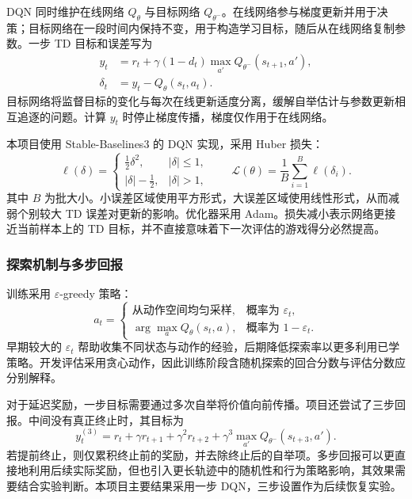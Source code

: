 DQN 同时维护在线网络 $Q_\theta$ 与目标网络 $Q_{\theta^-}$。在线网络参与梯度更新并用于决策；目标网络在一段时间内保持不变，用于构造学习目标，随后从在线网络复制参数。一步 TD 目标和误差写为
\begin{align}
 y_t &= r_t+\gamma(1-d_t)\max_{a'}Q_{\theta^-}(s_{t+1},a'),\\
 \delta_t &= y_t-Q_\theta(s_t,a_t).
\end{align}
目标网络将监督目标的变化与每次在线更新适度分离，缓解自举估计与参数更新相互追逐的问题。计算 $y_t$ 时停止梯度传播，梯度仅作用于在线网络。

本项目使用 Stable-Baselines3 的 DQN 实现，采用 Huber 损失：
\begin{equation}
 \ell(\delta)=
 \begin{cases}
 \frac{1}{2}\delta^2,& |\delta|\leq 1,\\
 |\delta|-\frac{1}{2},& |\delta|>1,
 \end{cases}
 \qquad
 \mathcal L(\theta)=\frac{1}{B}\sum_{i=1}^{B}\ell(\delta_i).
\end{equation}
其中 $B$ 为批大小。小误差区域使用平方形式，大误差区域使用线性形式，从而减弱个别较大 TD 误差对更新的影响。优化器采用 Adam。损失减小表示网络更接近当前样本上的 TD 目标，并不直接意味着下一次评估的游戏得分必然提高。

\subsubsection{探索机制与多步回报}
训练采用 $\varepsilon$-greedy 策略：
\begin{equation}
 a_t=
 \begin{cases}
 \text{从动作空间均匀采样},&\text{概率为 }\varepsilon_t,\\
 \arg\max_a Q_\theta(s_t,a),&\text{概率为 }1-\varepsilon_t.
 \end{cases}
\end{equation}
早期较大的 $\varepsilon_t$ 帮助收集不同状态与动作的经验，后期降低探索率以更多利用已学策略。开发评估采用贪心动作，因此训练阶段含随机探索的回合分数与评估分数应分别解释。

对于延迟奖励，一步目标需要通过多次自举将价值向前传播。项目还尝试了三步回报。中间没有真正终止时，其目标为
\begin{equation}
 y_t^{(3)}=r_t+\gamma r_{t+1}+\gamma^2r_{t+2}
 +\gamma^3\max_{a'}Q_{\theta^-}(s_{t+3},a').
\end{equation}
若提前终止，则仅累积终止前的奖励，并去除终止后的自举项。多步回报可以更直接地利用后续实际奖励，但也引入更长轨迹中的随机性和行为策略影响，其效果需要结合实验判断。本项目主要结果采用一步 DQN，三步设置作为后续恢复实验。

